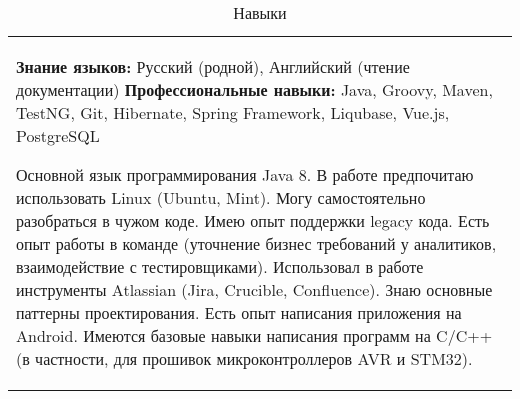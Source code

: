 \documentclass{article}
\begin{document}
\begin{table}[h!]
\begin{center}
\caption*{Навыки}
\def\arraystretch{1.7}%
\begin{tabular}
{ L{18.3cm} } \hhline{|=|}

\textbf{Знание языков:} Русский (родной), Английский (чтение документации)\newline
\textbf{Профессиональные навыки:} Java, Groovy, Maven, TestNG, Git, Hibernate, Spring Framework, Liqubase, Vue.js, PostgreSQL\medskip

Основной язык программирования Java 8. В работе предпочитаю использовать Linux (Ubuntu, Mint). Могу самостоятельно разобраться в чужом коде. Имею опыт поддержки legacy кода. Есть опыт работы в команде (уточнение бизнес требований у аналитиков, взаимодействие с тестировщиками). Использовал в работе инструменты Atlassian (Jira, Crucible, Confluence). Знаю основные паттерны проектирования. Есть опыт написания приложения на Android. Имеются базовые навыки написания программ на C/C++ (в частности, для прошивок микроконтроллеров AVR и STM32).

\end{tabular}
\end{center}
\end{table}
\end{document}
